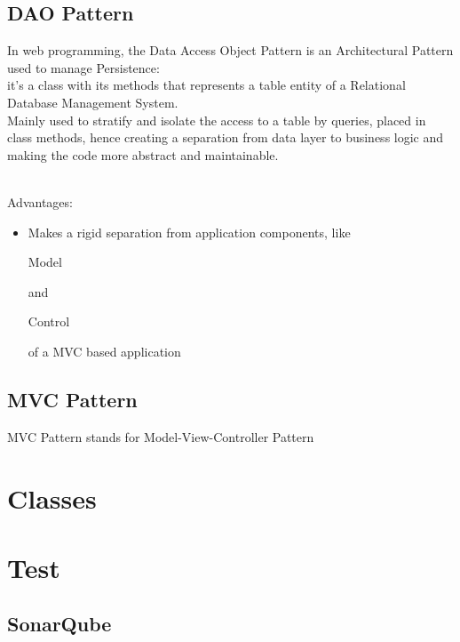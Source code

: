 \documentclass[12pt]{article}
\begin{document}
\subsection{DAO Pattern}
In web programming, the Data Access Object Pattern is an Architectural Pattern used to manage Persistence:\\
it's a class with its methods that represents a table entity of a Relational Database Management System.\\
Mainly used to stratify and isolate the access to a table by queries, placed in class methods, hence creating a separation from data layer to business logic and making the code more abstract and maintainable.\\
\\
\begin{itshape}
Advantages:
\end{itshape}
\begin{itemize}
\item Makes a rigid separation from application components, like 
\begin{itshape} 
Model 
\end{itshape} and 
\begin{itshape}
Control
\end{itshape} of a MVC based application
\end{itemize}
\subsection{MVC Pattern}
MVC Pattern stands for Model-View-Controller Pattern
\section{Classes}
\section{Test}
\subsection{SonarQube}
\end{document}
